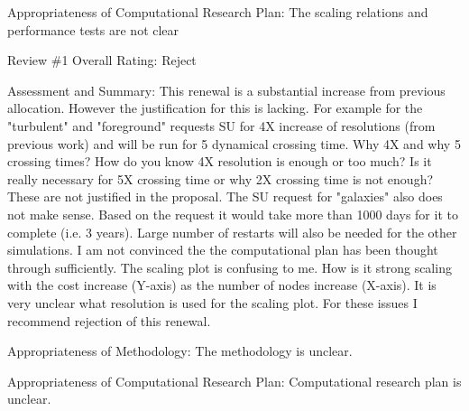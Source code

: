 Appropriateness of Computational Research Plan: The scaling relations and performance tests are not clear

Review \#1
Overall Rating: Reject

Assessment and Summary: This renewal is a substantial increase from previous allocation. However the justification for this is lacking. For example for the "turbulent" and "foreground" requests SU for 4X increase of resolutions (from previous work) and will be run for 5 dynamical crossing time. Why 4X and why 5 crossing times? How do you know 4X resolution is enough or too much? Is it really necessary for 5X crossing time or why 2X crossing time is not enough? These are not justified in the proposal.  The SU request for "galaxies" also does not make sense. Based on the request it would take more than 1000 days for it to complete (i.e. 3 years). Large number of restarts will also be needed for the other simulations. I am not convinced the the computational plan has been thought through sufficiently. The scaling plot is confusing to me. How is it strong scaling with the cost increase (Y-axis) as the number of nodes increase (X-axis). It is very unclear what resolution is used for the scaling plot. For these issues I recommend rejection of this renewal.

Appropriateness of Methodology: The methodology is unclear.

Appropriateness of Computational Research Plan: Computational research plan is unclear.
